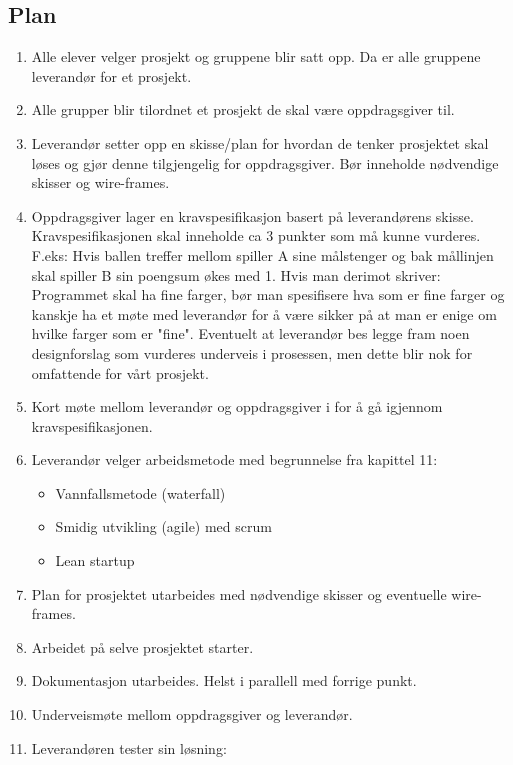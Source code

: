 \documentclass[11pt]{article} %
\begin{document}
    \subsection{Plan}
        \begin{enumerate}
            \item Alle elever velger prosjekt og gruppene blir satt opp. Da er alle gruppene leverandør for et prosjekt.
            \item Alle grupper blir tilordnet et prosjekt de skal være oppdragsgiver til.
            \item Leverandør setter opp en skisse/plan for hvordan de tenker prosjektet skal løses og gjør denne tilgjengelig for oppdragsgiver. Bør inneholde nødvendige skisser og wire-frames.
            \item Oppdragsgiver lager en kravspesifikasjon basert på leverandørens skisse. Kravspesifikasjonen skal inneholde ca 3 punkter som må kunne vurderes. F.eks: Hvis ballen treffer mellom spiller A sine målstenger og bak mållinjen skal spiller B sin poengsum økes med 1. Hvis man derimot skriver: Programmet skal ha fine farger, bør man spesifisere hva som er fine farger og kanskje ha et møte med leverandør for å være sikker på at man er enige om hvilke farger som er "fine". Eventuelt at leverandør bes legge fram noen designforslag som vurderes underveis i prosessen, men dette blir nok for omfattende for vårt prosjekt.
            \item Kort møte mellom leverandør og oppdragsgiver i for å gå igjennom kravspesifikasjonen.
            \item Leverandør velger arbeidsmetode med begrunnelse fra kapittel 11:
                \begin{itemize}
                    \item Vannfallsmetode (waterfall)
                    \item Smidig utvikling (agile) med scrum
                    \item Lean startup
                \end{itemize}
            \item Plan for prosjektet utarbeides med nødvendige skisser og eventuelle wire-frames.
            \item Arbeidet på selve prosjektet starter.
            \item Dokumentasjon utarbeides. Helst i parallell med forrige punkt.
            \item Underveismøte mellom oppdragsgiver og leverandør.
            \item Leverandøren tester sin løsning:

\end{enumerate}
\end{document}
